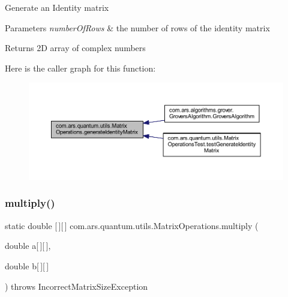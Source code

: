 Generate an Identity matrix 
\begin{DoxyParams}{Parameters}
{\em number\+Of\+Rows} & the number of rows of the identity matrix \\
\hline
\end{DoxyParams}
\begin{DoxyReturn}{Returns}
2D array of complex numbers 
\end{DoxyReturn}
Here is the caller graph for this function\+:\nopagebreak
\begin{figure}[H]
\begin{center}
\leavevmode
\includegraphics[width=350pt]{classcom_1_1ars_1_1quantum_1_1utils_1_1_matrix_operations_a0f677528a5f918884277771667bf2133_icgraph}
\end{center}
\end{figure}
\hypertarget{classcom_1_1ars_1_1quantum_1_1utils_1_1_matrix_operations_a0739b9c18cbe7d85ae01056f4b7e08d9}{}\label{classcom_1_1ars_1_1quantum_1_1utils_1_1_matrix_operations_a0739b9c18cbe7d85ae01056f4b7e08d9} 
\subsubsection{\texorpdfstring{multiply()}{multiply()}\hspace{0.1cm}{\footnotesize\ttfamily [1/2]}}
{\footnotesize\ttfamily static double \mbox{[}$\,$\mbox{]}\mbox{[}$\,$\mbox{]} com.\+ars.\+quantum.\+utils.\+Matrix\+Operations.\+multiply (\begin{DoxyParamCaption}\item[{double}]{a\mbox{[}$\,$\mbox{]}\mbox{[}$\,$\mbox{]},  }\item[{double}]{b\mbox{[}$\,$\mbox{]}\mbox{[}$\,$\mbox{]} }\end{DoxyParamCaption}) throws Incorrect\+Matrix\+Size\+Exception\hspace{0.3cm}{\ttfamily [static]}}

